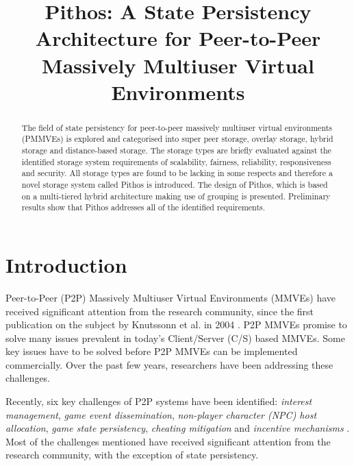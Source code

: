 \documentclass[10pt,a4paper,conference]{IEEEtran}
\begin{document}
%
\title{Pithos: A State Persistency Architecture for Peer-to-Peer Massively Multiuser Virtual Environments}


\maketitle

\begin{abstract}
The field of state persistency for peer-to-peer massively multiuser virtual environments (PMMVEs) is explored and categorised into super peer
storage, overlay storage, hybrid storage and distance-based storage. The storage types are briefly evaluated against the identified storage system
requirements of scalability, fairness, reliability, responsiveness and security. All storage types are found to be lacking in some respects and
therefore a novel storage system called Pithos is introduced. The design of Pithos, which is based on a multi-tiered hybrid architecture making use
of grouping is presented. Preliminary results show that Pithos addresses all of the identified requirements.

\end{abstract}


\section{Introduction}
\label{introduction}

Peer-to-Peer (P2P) Massively Multiuser Virtual Environments (MMVEs) have received significant attention from the research community, since the first
publication on the subject by Knutssonn et al. in 2004 \cite{knutsson_p2p_first}. P2P MMVEs promise to solve many issues prevalent in today's
Client/Server (C/S) based MMVEs. Some key issues have to be solved before P2P MMVEs can be implemented commercially. Over the past few years,
researchers have been addressing these challenges.

Recently, six key challenges of P2P systems have been identified: \emph{interest management}, \emph{game event dissemination}, \emph{non-player
character (NPC) host allocation}, \emph{game state persistency}, \emph{cheating mitigation} and \emph{incentive mechanisms}
\cite{Fan_deisgn_issues_p2p}. Most of the challenges mentioned have received significant attention from the research community, with the exception of
state persistency.
\end{document}
